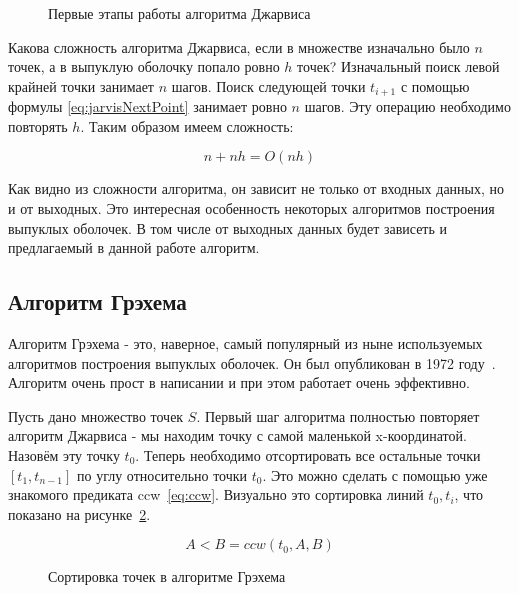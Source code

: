 \begin{figure}[H]
    {\centering
        \hfill
        \subbottom[\label{img:jarvis_1}]{%
            }
        \hfill
        \subbottom[\label{img:jarvis_2}]{%
            }
        \hfill
    }
    \caption{Первые этапы работы алгоритма Джарвиса}
    \label{img:jarvis}
\end{figure}

Какова сложность алгоритма Джарвиса, если в множестве изначально было $n$ точек, а в выпуклую оболочку попало ровно $h$ точек? Изначальный поиск левой крайней точки занимает $n$ шагов. Поиск следующей точки $t_{i+1}$ с помощью формулы \eqref{eq:jarvisNextPoint} занимает ровно $n$ шагов. Эту операцию необходимо повторять $h$. Таким образом имеем сложность:

\[
n+ nh = O(nh)
\]

Как видно из сложности алгоритма, он зависит не только от входных данных, но и от выходных. Это интересная особенность некоторых алгоритмов построения выпуклых оболочек. В том числе от выходных данных будет зависеть и предлагаемый в данной работе алгоритм.

\subsection{Алгоритм Грэхема} \label{subsect1_1_2}

Алгоритм Грэхема - это, наверное, самый популярный из ныне используемых алгоритмов построения выпуклых оболочек. Он был опубликован в 1972 году~\cite{graham1972GrahamScan}. Алгоритм очень прост в написании и при этом работает очень эффективно.

Пусть дано множество точек $S$. Первый шаг алгоритма полностью повторяет алгоритм Джарвиса - мы находим точку с самой маленькой x-координатой. Назовём эту точку $t_0$. Теперь необходимо отсортировать все остальные точки $[t_1, t_{n-1}]$ по углу относительно точки $t_0$. Это можно сделать с помощью уже знакомого предиката ccw~\eqref{eq:ccw}. Визуально это сортировка линий $t_0, t_i$, что показано на рисунке~\ref{img:graham_sort}.

\[
A<B=ccw(t_0, A, B)
\]

\begin{figure}
	\centering
	
	\caption{Сортировка точек в алгоритме Грэхема}
	\label{img:graham_sort}
\end{figure}


